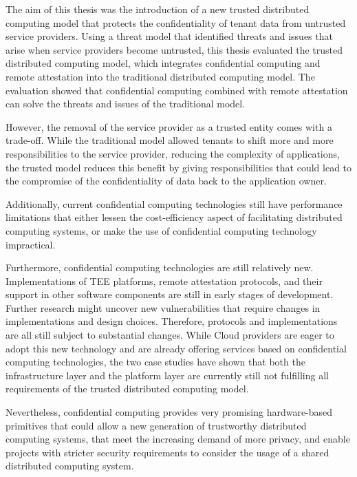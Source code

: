 The aim of this thesis was the introduction of a new trusted distributed
computing model that protects the confidentiality of tenant data from untrusted
service providers. Using a threat model that identified threats and issues that
arise when service providers become untrusted, this thesis evaluated the trusted
distributed computing model, which integrates confidential computing and remote
attestation into the traditional distributed computing model. The evaluation
showed that confidential computing combined with remote attestation can solve
the threats and issues of the traditional model.

However, the removal of the service provider as a trusted entity comes with a
trade-off. While the traditional model allowed tenants to shift more and more
responsibilities to the service provider, reducing the complexity of
applications, the trusted model reduces this benefit by giving responsibilities
that could lead to the compromise of the confidentiality of data back to the
application owner.

Additionally, current confidential computing technologies still have performance
limitations that either lessen the cost-efficiency aspect of facilitating
distributed computing systems, or make the use of confidential computing
technology impractical.

Furthermore, confidential computing technologies are still relatively new.
Implementations of TEE platforms, remote attestation protocols, and their
support in other software components are still in early stages of development.
Further research might uncover new vulnerabilities that require changes in
implementations and design choices. Therefore, protocols and implementations are
all still subject to substantial changes. While Cloud providers are eager to
adopt this new technology and are already offering services based on
confidential computing technologies, the two case studies have shown that both
the infrastructure layer and the platform layer are currently still not
fulfilling all requirements of the trusted distributed computing model.

Nevertheless, confidential computing provides very promising hardware-based
primitives that could allow a new generation of trustworthy distributed
computing systems, that meet the increasing demand of more privacy, and enable
projects with stricter security requirements to consider the usage of a shared
distributed computing system.
